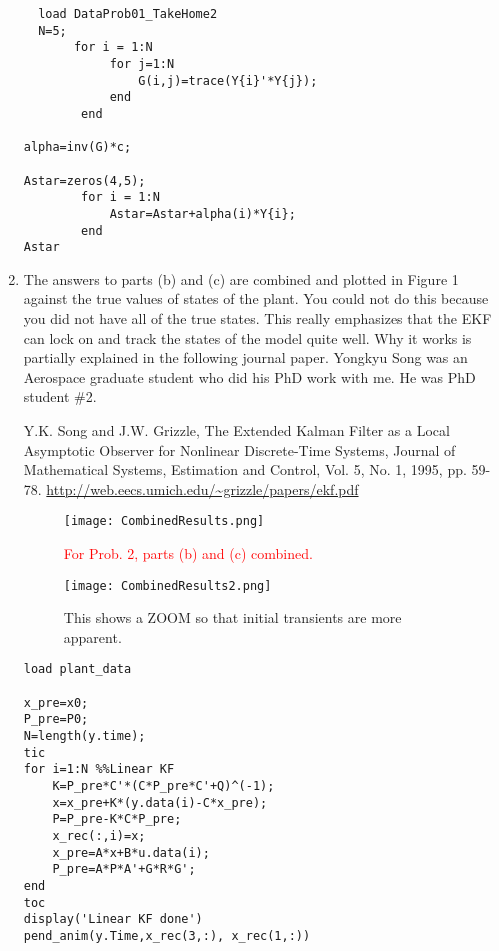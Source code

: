 \documentclass[letterpaper]{article}
\begin{document}
\begin{enumerate}
\begin{verbatim}
  load DataProb01_TakeHome2
  N=5;
       for i = 1:N
            for j=1:N
                G(i,j)=trace(Y{i}'*Y{j});
            end
        end

alpha=inv(G)*c;

Astar=zeros(4,5);
        for i = 1:N
            Astar=Astar+alpha(i)*Y{i};
        end
Astar
\end{verbatim}

\newpage

\item The answers to parts (b) and (c) are combined and plotted in Figure 1 against the true values of states of the plant. You could not do this because you did not have all of the true states. This really emphasizes that the EKF can lock on and track the states of the model quite well. Why it works is partially explained in the following journal paper. Yongkyu Song was an Aerospace graduate student who did his PhD work with me. He was PhD student \#2.

    Y.K. Song and J.W. Grizzle, The Extended Kalman Filter as a Local Asymptotic Observer for Nonlinear Discrete-Time Systems, Journal of Mathematical Systems, Estimation and Control, Vol. 5, No. 1, 1995, pp. 59-78. \url{http://web.eecs.umich.edu/~grizzle/papers/ekf.pdf}

   \begin{figure}[h!]
   \label{Fig1}
	\begin{minipage}[t]{\linewidth}
		\centering
		\texttt{[image: CombinedResults.png]}
		\setlength{\abovecaptionskip}{0pt}
		\caption{\textcolor{red}{For Prob. 2, parts (b) and (c) combined.}}
	\end{minipage}
\end{figure}

\newpage

   \begin{figure}[h!]
   \label{Fig1}
	\begin{minipage}[t]{\linewidth}
		\centering
		\texttt{[image: CombinedResults2.png]}
		\setlength{\abovecaptionskip}{0pt}
		\caption{This shows a ZOOM so that initial transients are more apparent.}
	\end{minipage}
\end{figure}

\newpage

\begin{verbatim}
load plant_data

x_pre=x0;
P_pre=P0;
N=length(y.time);
tic
for i=1:N %%Linear KF
    K=P_pre*C'*(C*P_pre*C'+Q)^(-1);
    x=x_pre+K*(y.data(i)-C*x_pre);
    P=P_pre-K*C*P_pre;
    x_rec(:,i)=x;
    x_pre=A*x+B*u.data(i);
    P_pre=A*P*A'+G*R*G';
end
toc
display('Linear KF done')
pend_anim(y.Time,x_rec(3,:), x_rec(1,:))



\end{verbatim}
\end{enumerate}
\end{document}
